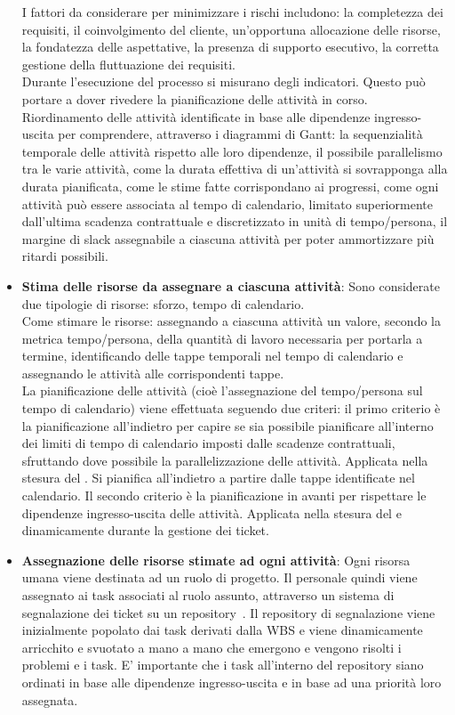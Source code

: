 \begin{itemize}
     I fattori da considerare per minimizzare i rischi includono: la completezza dei requisiti, il coinvolgimento del cliente, un'opportuna allocazione delle risorse, la fondatezza delle aspettative, la presenza di supporto esecutivo, la corretta gestione della fluttuazione dei requisiti.\\
     Durante l'esecuzione del processo si misurano degli indicatori. Questo può portare a dover rivedere la pianificazione delle attività in corso. \\
     Riordinamento delle attività identificate in base alle dipendenze ingresso-uscita per comprendere, attraverso i diagrammi di Gantt: la sequenzialità temporale delle attività rispetto alle loro dipendenze, il possibile parallelismo tra le varie attività, come la durata effettiva di un'attività si sovrapponga alla durata pianificata, come le stime fatte corrispondano ai progressi, come ogni attività può essere associata al tempo di calendario, limitato superiormente dall'ultima scadenza contrattuale e discretizzato in unità di tempo/persona, il margine di slack assegnabile a ciascuna attività per poter ammortizzare più ritardi possibili.
    \item \textbf{Stima delle risorse da assegnare a ciascuna attività}: Sono considerate due tipologie di risorse: sforzo, tempo di calendario. \\
     Come stimare le risorse: assegnando a ciascuna attività un valore, secondo la metrica tempo/persona, della quantità di lavoro necessaria per portarla a termine, identificando delle tappe temporali nel tempo di calendario e assegnando le attività alle corrispondenti tappe.\\
     La pianificazione delle attività (cioè l'assegnazione del tempo/persona sul tempo di calendario) viene effettuata seguendo due criteri: il primo criterio è la pianificazione all'indietro per capire se sia possibile pianificare all'interno dei limiti di tempo di calendario imposti dalle scadenze contrattuali, sfruttando dove possibile la parallelizzazione delle attività. Applicata nella stesura del \PdPdocumento. Si pianifica all'indietro a partire dalle tappe identificate nel calendario. Il secondo criterio è la pianificazione in avanti per rispettare le dipendenze ingresso-uscita delle attività. Applicata nella stesura del \PdPdocumento e dinamicamente durante la gestione dei ticket.
    \item \textbf{Assegnazione delle risorse stimate ad ogni attività}: Ogni risorsa umana viene destinata ad un ruolo di progetto. Il personale quindi viene assegnato ai task associati al ruolo assunto, attraverso un sistema di segnalazione dei ticket su un repository\glo\ . Il repository di segnalazione viene inizialmente popolato dai task derivati dalla WBS e viene dinamicamente arricchito e svuotato a mano a mano che emergono e vengono risolti i problemi e i task. E' importante che i task all'interno del repository siano ordinati in base alle dipendenze ingresso-uscita e in base ad una priorità loro assegnata.
\end{itemize}

